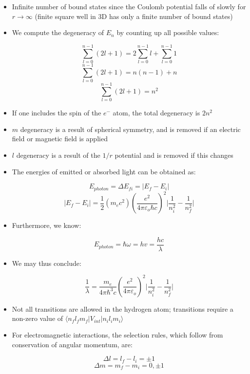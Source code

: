 \begin{itemize}
\begin{itemize}
\begin{itemize}
          \item Infinite number of bound states since the Coulomb potential falls of slowly for $r\to\infty$ (finite square well in 3D has only a finite number of bound states)

          \item We compute the degeneracy of $E_n$ by counting up all possible values:

            $$\sum_{l=0}^{n-1}(2l+1)=2\sum_{l=0}^{n-1} l +\sum_{l=0}^{n-1}1$$
            $$\sum_{l=0}^{n-1}(2l+1)= n(n-1)+n$$
            $$\sum_{l=0}^{n-1}(2l+1)= n^2$$

          \item If one includes the spin of the $e^-$ atom, the total degeneracy is $2n^2$

          \item $m$ degeneracy is a result of spherical symmetry, and is removed if an electric field or magnetic field is applied

          \item $l$ degeneracy is a result of the $1/r$ potential and is removed if this changes

          \item The energies of emitted or absorbed light can be obtained as:

            $$E_{photon}=\Delta E_{fi}=|E_f-E_i|$$
            $$|E_f-E_i|=\frac{1}{2}(m_ec^2)\left( \frac{e^2}{4\pi\varepsilon_o\hbar c} \right)^2\Big|\frac{1}{n_i^2}-\frac{1}{n^2_f}\Big|$$

          \item Furthermore, we know:

            $$E_{photon}=\hbar\omega=hv=\frac{hc}{\lambda}$$

          \item We may thus conclude:

            $$\frac{1}{\lambda}=\frac{m_e}{4\pi\hbar^3c}\left( \frac{e^2}{4\pi\varepsilon_o} \right)^2\Big|\frac{1}{n_i^2}-\frac{1}{n^2_f}\Big|$$

          \item Not all transitions are allowed in the hydrogen atom; transitions require a non-zero value of $\langle n_fl_fm_f|V_{int}|n_il_im_i\rangle$

          \item For electromagnetic interactions, the selection rules, which follow from conservation of angular momentum, are:

            $$\Delta l=l_f-l_i=\pm1$$
            $$\Delta m=m_f-m_i=0,\pm1$$


\end{itemize}
\end{itemize}
\end{itemize}
